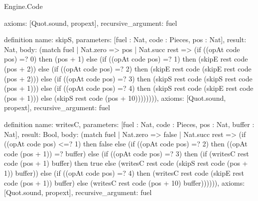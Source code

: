 \begin{lexlean}{Engine.Code}
\begin{semanticmodule}
{  axioms: [Quot.sound, propext],
  recursive_argument: fuel
}

definition{
  name: skipS,
  parameters: [fuel : Nat, code : Pieces, pos : Nat],
  result: Nat,
  body: (match fuel
    | Nat.zero => pos
    | Nat.succ rest => (if ((opAt code pos) =? 0) then (pos + 1) else (if ((opAt code pos) =? 1) then (skipE rest code (pos + 2)) else (if ((opAt code pos) =? 2) then (skipE rest code (skipE rest code (pos + 2))) else (if ((opAt code pos) =? 3) then (skipS rest code (skipS rest code (pos + 1))) else (if ((opAt code pos) =? 4) then (skipS rest code (skipE rest code (pos + 1))) else (skipS rest code (pos + 10)))))))),
  axioms: [Quot.sound, propext],
  recursive_argument: fuel
}

definition{
  name: writesC,
  parameters: [fuel : Nat, code : Pieces, pos : Nat, buffer : Nat],
  result: Bool,
  body: (match fuel
    | Nat.zero => false
    | Nat.succ rest => (if ((opAt code pos) <=? 1) then false else (if ((opAt code pos) =? 2) then ((opAt code (pos + 1)) =? buffer) else (if ((opAt code pos) =? 3) then (if (writesC rest code (pos + 1) buffer) then true else (writesC rest code (skipS rest code (pos + 1)) buffer)) else (if ((opAt code pos) =? 4) then (writesC rest code (skipE rest code (pos + 1)) buffer) else (writesC rest code (pos + 10) buffer)))))),
  axioms: [Quot.sound, propext],
  recursive_argument: fuel
}


\end{semanticmodule}
\end{lexlean}
